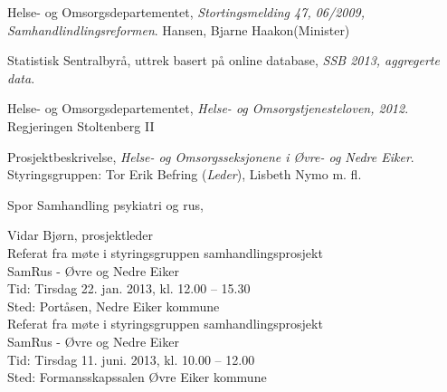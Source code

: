 \documentclass[11pt]{report} %
\begin{document}
              \begin{thebibliography}{99}

                  Helse- og Omsorgsdepartementet,
                  \emph{Stortingsmelding 47, 06/2009, Samhandlindlingsreformen}.
                  Hansen, Bjarne Haakon(Minister)

                  Statistisk Sentralbyrå, uttrek basert på online database,
                  \emph{SSB 2013, aggregerte data}.

                  Helse- og Omsorgsdepartementet,
                  \emph{Helse- og Omsorgstjenesteloven, 2012}.
                  Regjeringen Stoltenberg II

                  Prosjektbeskrivelse,
                  \emph{Helse- og Omsorgsseksjonene i Øvre- og Nedre Eiker}.
                  Styringsgruppen: Tor Erik Befring (\emph{Leder}), Lisbeth Nymo m. fl.

                  Spor Samhandling psykiatri og rus,
                  Vidar Bjørn, prosjektleder \href{mailto:vibjoe@siv.no}{}\\

                  Referat fra møte i styringsgruppen samhandlingsprosjekt\\ 
                  SamRus - Øvre og Nedre Eiker\\
                  Tid: Tirsdag 22. jan. 2013,  kl. 12.00 – 15.30\\
                  Sted: Portåsen, Nedre Eiker kommune\\

                  Referat fra møte i styringsgruppen samhandlingsprosjekt\\ 
                  SamRus - Øvre og Nedre Eiker\\
                  Tid: Tirsdag 11. juni. 2013,  kl. 10.00 – 12.00\\
                  Sted: Formansskapssalen Øvre Eiker kommune\\


\end{thebibliography}
\end{document}
